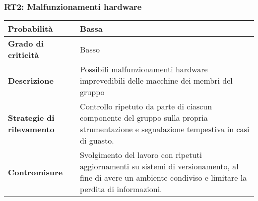\noindent\begin{minipage}{\textwidth}
\subsubsection{RT2: Malfunzionamenti hardware}

\bgroup
\begin{adjustwidth}{-0.5cm}{-0.5cm}
 	\begin{longtable}{P{4.5cm}|>{\justifying \arraybackslash}P{9cm}}

		\textbf{Probabilità} & Bassa \\
        \hline
        \textbf{Grado di criticità} & Basso \\
        \hline
        \textbf{Descrizione} & Possibili malfunzionamenti hardware imprevedibili delle macchine dei membri del gruppo \\
        \hline
        \textbf{Strategie di rilevamento} & Controllo ripetuto da parte di ciascun componente del gruppo sulla propria strumentazione e segnalazione tempestiva in casi di guasto. \\
        \hline
        \textbf{Contromisure} & Svolgimento del lavoro con ripetuti aggiornamenti su sistemi di versionamento, al fine di avere un ambiente condiviso e limitare la perdita di informazioni.  
	\end{longtable}
\end{adjustwidth}
\egroup
\end{minipage}
